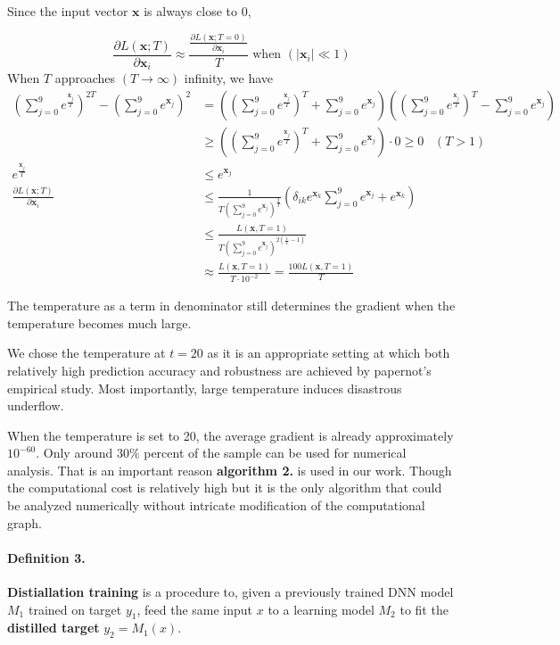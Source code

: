 \documentclass{article}
\begin{document}
Since the input vector $\mathbf{x}$ is always close to 0,

\begin{equation}
	\frac{\partial L(\mathbf{x};T)}{\partial \mathbf{x}_i}
	\approx \frac{\frac{\partial L(\mathbf{x};T=0)}{\partial \mathbf{x}_i}}{T} \text{ when } (\mid \mathbf{x}_i \mid \ll 1)
\end{equation}
When $T$ approaches $(T \rightarrow \infty)$ infinity, we have 
\begin{align*}
	(\sum_{j=0}^9 e^{\frac{\mathbf{x}_j}{T}})^{2T} -
	(\sum_{j=0}^9 e^{\mathbf{x}_j})^{2}
	&=((\sum_{j=0}^9 e^{\frac{\mathbf{x}_j}{T}})^T+
	\sum_{j=0}^9 e^{\mathbf{x}_j})((\sum_{j=0}^9 e^{\frac{\mathbf{x}_j}{T}})^T-\sum_{j=0}^9 e^{\mathbf{x}_j})\\
	&\ge((\sum_{j=0}^9 e^{\frac{\mathbf{x}_j}{T}})^T+
	\sum_{j=0}^9 e^{\mathbf{x}_j})\cdot 0 \ge 0 \hspace{10pt} (T > 1)\\
	e^{\frac{\mathbf{x}_j}{T}} &\le e^{\mathbf{x}_j}\\
	\frac{\partial L(\mathbf{x};T)}{\partial \mathbf{x}_i} &\le 
	\frac{1}{T(\sum_{j=0}^9 e^{\mathbf{x}_j})^{\frac{2}{T}}} (
	\delta_{ik} e^{\mathbf{x}_k}
	\sum_{j=0}^9 e^{\mathbf{x}_j}+
	e^{\mathbf{x}_k} )\\
	&\le \frac{L(\mathbf{x},T=1)}{T(\sum_{j=0}^9 e^{\mathbf{x}_j})^{2(\frac{1}{T}-1)}}\\
	&\approx 
	\frac{L(\mathbf{x},T=1)}{T\cdot 10^{-2}} = 
	\frac{100L(\mathbf{x},T=1)}{T}
\end{align*}

The temperature as a term in denominator still determines the gradient when the temperature becomes much large.

We chose the temperature at $t=20$ as it is an appropriate setting at which both relatively high prediction accuracy and robustness are achieved by papernot's empirical study\cite{Papernot}. Most importantly, large temperature induces disastrous underflow. 

When the temperature is set to 20, the average gradient is already approximately $10^{-60}$. Only around $30\%$ percent of the sample can be used for numerical analysis. That is an important reason \textbf{algorithm 2.} is used in our work. 
Though the computational cost is relatively high but it is the only algorithm that could be analyzed numerically without intricate modification of the computational graph.

\paragraph{Definition 3.} 
\textbf{Distiallation training} is a procedure to, given a previously trained DNN model $M_1$ trained on target $y_1$, feed the same input $x$ to a learning model $M_2$ to fit the \textbf{distilled target} $y_2=M_1(x)$.\cite{Ba}
\end{document}
